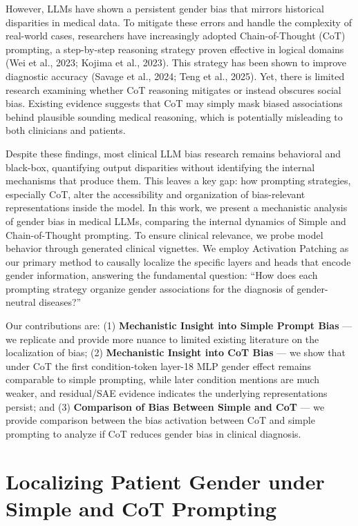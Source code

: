 \documentclass{article}
\begin{document}
However, LLMs have shown a persistent gender bias that mirrors historical disparities in medical data. To mitigate these errors and handle the complexity of real-world cases, researchers have increasingly adopted Chain-of-Thought (CoT) prompting, a step-by-step reasoning strategy proven effective in logical domains (Wei et al., 2023; Kojima et al., 2023). This strategy has been shown to improve diagnostic accuracy (Savage et al., 2024; Teng et al., 2025). Yet, there is limited research examining whether CoT reasoning mitigates or instead obscures social bias. Existing evidence suggests that CoT may simply mask biased associations behind plausible sounding medical reasoning, which is potentially misleading to both clinicians and patients.

Despite these findings, most clinical LLM bias research remains behavioral and black-box, quantifying output disparities without identifying the internal mechanisms that produce them. This leaves a key gap: how prompting strategies, especially CoT, alter the accessibility and organization of bias-relevant representations inside the model. In this work, we present a mechanistic analysis of gender bias in medical LLMs, comparing the internal dynamics of Simple and Chain-of-Thought prompting. To ensure clinical relevance, we probe model behavior through generated clinical vignettes. We employ Activation Patching as our primary method to causally localize the specific layers and heads that encode gender information, answering the fundamental question: ``How does each prompting strategy organize gender associations for the diagnosis of gender-neutral diseases?''

Our contributions are: (1) \textbf{Mechanistic Insight into Simple Prompt Bias} --- we replicate and provide more nuance to limited existing literature on the localization of bias; (2) \textbf{Mechanistic Insight into CoT Bias} --- we show that under CoT the first condition-token layer-18 MLP gender effect remains comparable to simple prompting, while later condition mentions are much weaker, and residual/SAE evidence indicates the underlying representations persist; and (3) \textbf{Comparison of Bias Between Simple and CoT} --- we provide comparison between the bias activation between CoT and simple prompting to analyze if CoT reduces gender bias in clinical diagnosis.


\section{Localizing Patient Gender under Simple and CoT Prompting}
\end{document}
